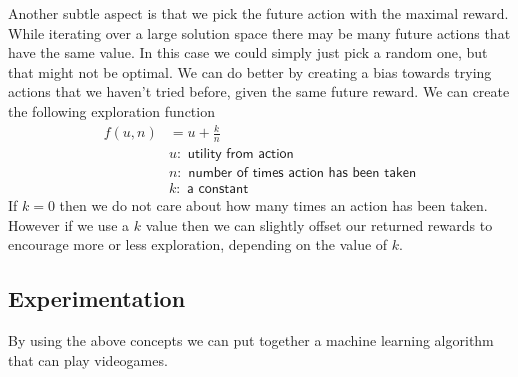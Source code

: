 Another subtle aspect is that we pick the future action with the maximal reward.
While iterating over a large solution space there may be many future actions that
have the same value. In this case we could simply just pick a random one, but
that might not be optimal. We can do better by creating a bias towards trying
actions that we haven't tried before, given the same future reward. We can
create the following exploration function
\begin{align*}
    f(u,n) &= u + \frac{k}{n}\\
    & u: \textsf{ utility from action}\\
    & n: \textsf{ number of times action has been taken}\\
    & k: \textsf{ a constant}
\end{align*}
If $k=0$ then we do not care about how many times an action has been taken. 
However if we use a $k$ value then we can slightly offset our returned rewards
to encourage more or less exploration, depending on the value of $k$. 

\subsection{Experimentation}
By using the above concepts we can put together a machine learning algorithm
that can play videogames. 
